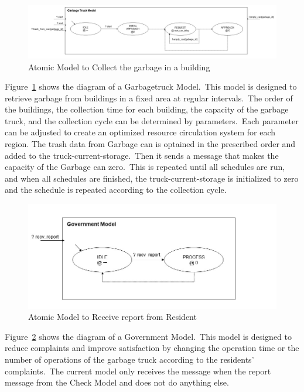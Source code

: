 \documentclass{scsSimAUDPaperFormat}
\begin{document}
\begin{figure}[!ht]
    \centering
    \includegraphics[width=1.0\columnwidth]{fig/garbagetruck_model.jpg}
    \caption{Atomic Model to Collect the garbage in a building}
    \label{Fig:garbageTruckmodel}
\end{figure}
Figure~\ref{Fig:garbageTruckmodel} shows the diagram of a Garbagetruck Model.~This model is designed to retrieve garbage from buildings in a fixed area at regular intervals.~The order of the buildings, the collection time for each building, the capacity of the garbage truck, and the collection cycle can be determined by parameters.~Each parameter can be adjusted to create an optimized resource circulation system for each region. The trash data from Garbage can is optained in the prescribed order and added to the truck-current-storage.~Then it sends a message that makes the capacity of the Garbage can zero.~This is repeated until all schedules are run, and when all schedules are finished, the truck-current-storage is initialized to zero and the schedule is repeated according to the collection cycle.
\begin{figure}[!ht]
    \centering
    \includegraphics[width=1.0\columnwidth]{fig/government_model.jpg}
    \caption{Atomic Model to Receive report from Resident}
    \label{Fig:Governmentmodel}
\end{figure}
Figure~\ref{Fig:Governmentmodel} shows the diagram of a Government Model.~This model is designed to reduce complaints and improve satisfaction by changing the operation time or the number of operations of the garbage truck according to the residents' complaints.~The current model only receives the message when the report message from the Check Model and does not do anything else.
\end{document}
